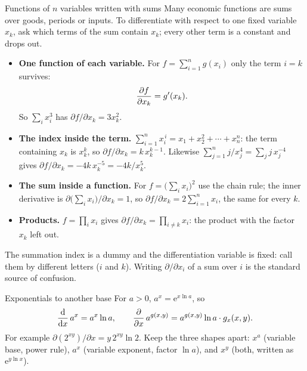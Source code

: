 \begin{rulebox}{Functions of $n$ variables written with sums}
Many economic functions are sums over goods, periods or inputs. To
differentiate with respect to one fixed variable $x_{k}$, ask which terms of
the sum contain $x_{k}$; every other term is a constant and drops out.
\begin{itemize}[leftmargin=1.6em,itemsep=0.3ex]
  \item \textbf{One function of each variable.} For
        $f=\sum_{i=1}^{n}g(x_{i})$ only the term $i=k$ survives:
        \[
          \frac{\partial f}{\partial x_{k}}=g'(x_{k}) .
        \]
        So $\sum_{i}x_{i}^{3}$ has $\partial f/\partial x_{k}=3x_{k}^{2}$.
  \item \textbf{The index inside the term.} $\sum_{i=1}^{n}x_{i}^{\,i}
        =x_{1}+x_{2}^{2}+\cdots+x_{n}^{n}$: the term containing $x_{k}$ is
        $x_{k}^{k}$, so $\partial f/\partial x_{k}=k\,x_{k}^{k-1}$.
        Likewise $\sum_{j=1}^{n}j/x_{j}^{4}=\sum_{j}j\,x_{j}^{-4}$ gives
        $\partial f/\partial x_{k}=-4k\,x_{k}^{-5}=-4k/x_{k}^{5}$.
  \item \textbf{The sum inside a function.} For $f=\bigl(\sum_{i}x_{i}\bigr)^{2}$
        use the chain rule; the inner derivative is
        $\partial\bigl(\sum_{i}x_{i}\bigr)/\partial x_{k}=1$, so
        $\partial f/\partial x_{k}=2\sum_{i=1}^{n}x_{i}$, the same for
        every $k$.
  \item \textbf{Products.} $f=\prod_{i}x_{i}$ gives
        $\partial f/\partial x_{k}=\prod_{i\neq k}x_{i}$: the product with
        the factor $x_{k}$ left out.
\end{itemize}
The summation index is a dummy and the differentiation variable is fixed:
call them by different letters ($i$ and $k$). Writing
$\partial/\partial x_{i}$ of a sum over $i$ is the standard source of
confusion.
\end{rulebox}

\begin{rulebox}{Exponentials to another base}
For $a>0$, $a^{x}=\mathrm{e}^{x\ln a}$, so
\[
  \frac{\mathrm{d}}{\mathrm{d}x}\,a^{x}=a^{x}\ln a,
  \qquad
  \frac{\partial }{\partial x}\,a^{g(x,y)}=a^{g(x,y)}\ln a\cdot g_{x}(x,y) .
\]
For example $\partial(2^{xy})/\partial x=y\,2^{xy}\ln2$. Keep the three
shapes apart: $x^{a}$ (variable base, power rule), $a^{x}$ (variable
exponent, factor $\ln a$), and $x^{y}$ (both, written as
$\mathrm{e}^{y\ln x}$).
\end{rulebox}

